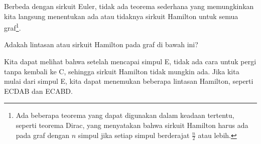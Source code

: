 Berbeda dengan sirkuit Euler, tidak ada teorema sederhana yang memungkinkan kita langsung menentukan ada atau tidaknya sirkuit Hamilton untuk semua graf\footnote{Ada beberapa teorema yang dapat digunakan dalam keadaan tertentu, seperti teorema Dirac, yang menyatakan bahwa sirkuit Hamilton harus ada pada graf dengan $n$ simpul jika setiap simpul berderajat $\frac{n}{2}$ atau lebih.}.  

\begin{example}{} %
Adakah lintasan atau sirkuit Hamilton pada graf di bawah ini?\\


Kita dapat melihat bahwa setelah mencapai simpul E, tidak ada cara untuk pergi tanpa kembali ke C, sehingga sirkuit Hamilton tidak mungkin ada.  Jika kita mulai dari simpul E, kita dapat menemukan beberapa lintasan Hamilton, seperti ECDAB dan ECABD.
\end{example}

